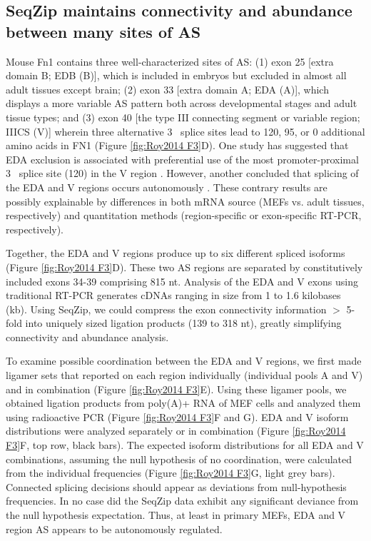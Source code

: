 {	\subsection{SeqZip maintains connectivity and abundance between many sites of AS}

		Mouse Fn1 contains three well-characterized sites of AS: (1) exon 25 [extra domain B; EDB (B)], which is included in embryos but excluded in almost all adult tissues except brain; (2) exon 33 [extra domain A; EDA (A)], which displays a more variable AS pattern both across developmental stages and adult tissue types; and (3) exon 40 [the type III connecting segment or variable region; IIICS (V)] wherein three alternative 3\textprime~ splice sites lead to 120, 95, or 0 additional amino acids in FN1 (Figure \ref{fig:Roy2014 F3}D). One study has suggested that EDA exclusion is associated with preferential use of the most promoter-proximal 3\textprime~ splice site (120) in the V region \citep{Fededa2005}. However, another concluded that splicing of the EDA and V regions occurs autonomously \citep{Chauhan2004}. These contrary results are possibly explainable by differences in both mRNA source (MEFs vs. adult tissues, respectively) and quantitation methods (region-specific or exon-specific RT-PCR, respectively).

		Together, the EDA and V regions produce up to six different spliced isoforms (Figure \ref{fig:Roy2014 F3}D). These two AS regions are separated by constitutively included exons 34-39 comprising 815 nt. Analysis of the EDA and V exons using traditional RT-PCR generates cDNAs ranging in size from 1 to 1.6 kilobases (kb). Using SeqZip, we could compress the exon connectivity information $>$ 5-fold into uniquely sized ligation products (139 to 318 nt), greatly simplifying connectivity and abundance analysis.

		To examine possible coordination between the EDA and V regions, we first made ligamer sets that reported on each region individually (individual pools A and V) and in combination (Figure \ref{fig:Roy2014 F3}E). Using these ligamer pools, we obtained ligation products from poly(A)+ RNA of MEF cells and analyzed them using radioactive PCR (Figure \ref{fig:Roy2014 F3}F and G). EDA and V isoform distributions were analyzed separately or in combination (Figure \ref{fig:Roy2014 F3}F, top row, black bars). The expected isoform distributions for all EDA and V combinations, assuming the null hypothesis of no coordination, were calculated from the individual frequencies (Figure \ref{fig:Roy2014 F3}G, light grey bars). Connected splicing decisions should appear as deviations from null-hypothesis frequencies. In no case did the SeqZip data exhibit any significant deviance from the null hypothesis expectation. Thus, at least in primary MEFs, EDA and V region AS appears to be autonomously regulated.

}
